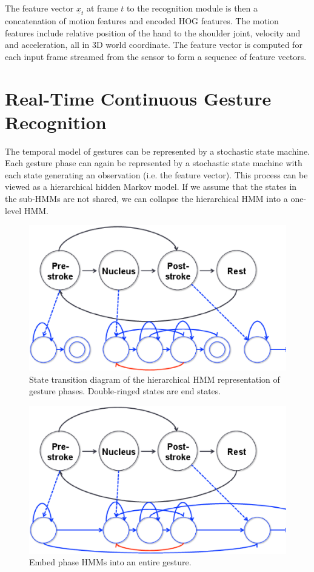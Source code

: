 \documentclass[conference]{IEEEtran}
\begin{document}
The feature vector $\underline{x}_t$ at frame $t$ to the recognition
module is then a concatenation of motion features and encoded HOG features. The
motion features include relative position of the hand to the shoulder joint,
velocity and and acceleration, all in 3D world coordinate. The feature vector is
computed for each input frame streamed from the sensor to form a sequence of
feature vectors.

\section{Real-Time Continuous Gesture Recognition}
The temporal model of gestures can be represented by a stochastic state machine.
Each gesture phase can again be represented by a stochastic state machine with
each state generating an observation (i.e. the feature vector). This process
can be viewed as a hierarchical hidden Markov model. If we assume that the
states in the sub-HMMs are not shared, we can collapse the hierarchical HMM
into a one-level HMM. 

\begin{figure}[!t]
\centering
\includegraphics[width=\columnwidth]{fig/hhmm.ps}
\caption{State transition diagram of the hierarchical HMM representation of
gesture phases. Double-ringed states are end states.}
\label{fig:hhmm}
\end{figure}

\begin{figure}[!t]
\centering
\includegraphics[width=\columnwidth]{fig/embedded.ps}
\caption{Embed phase HMMs into an entire gesture.}
\label{fig:embed}
\end{figure}
\end{document}
